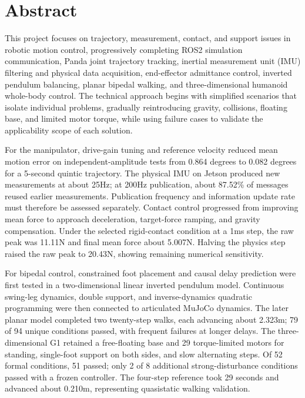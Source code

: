 \chapter*{Abstract}
This project focuses on trajectory, measurement, contact, and support issues in robotic motion control, progressively completing ROS2 simulation communication, Panda joint trajectory tracking, inertial measurement unit (IMU) filtering and physical data acquisition, end-effector admittance control, inverted pendulum balancing, planar bipedal walking, and three-dimensional humanoid whole-body control. The technical approach begins with simplified scenarios that isolate individual problems, gradually reintroducing gravity, collisions, floating base, and limited motor torque, while using failure cases to validate the applicability scope of each solution.

For the manipulator, drive-gain tuning and reference velocity reduced mean motion error on independent-amplitude tests from 0.864 degrees to 0.082 degrees for a 5-second quintic trajectory. The physical IMU on Jetson produced new measurements at about 25Hz; at 200Hz publication, about 87.52\% of messages reused earlier measurements. Publication frequency and information update rate must therefore be assessed separately. Contact control progressed from improving mean force to approach deceleration, target-force ramping, and gravity compensation. Under the selected rigid-contact condition at a 1ms step, the raw peak was 11.11N and final mean force about 5.007N. Halving the physics step raised the raw peak to 20.43N, showing remaining numerical sensitivity.

For bipedal control, constrained foot placement and causal delay prediction were first tested in a two-dimensional linear inverted pendulum model. Continuous swing-leg dynamics, double support, and inverse-dynamics quadratic programming were then connected to articulated MuJoCo dynamics. The later planar model completed two twenty-step walks, each advancing about 2.323m; 79 of 94 unique conditions passed, with frequent failures at longer delays. The three-dimensional G1 retained a free-floating base and 29 torque-limited motors for standing, single-foot support on both sides, and slow alternating steps. Of 52 formal conditions, 51 passed; only 2 of 8 additional strong-disturbance conditions passed with a frozen controller. The four-step reference took 29 seconds and advanced about 0.210m, representing quasistatic walking validation.

